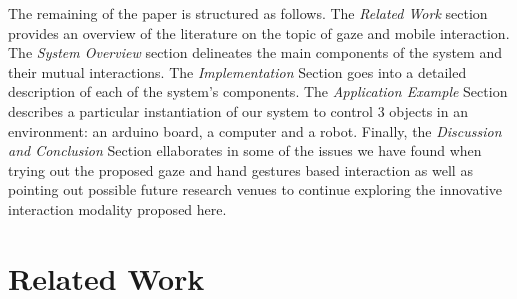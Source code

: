 \documentclass[jou,a4paper,notxfonts]{apa}
\begin{document}
The remaining of the paper is structured as follows. The \emph{Related Work} section provides an overview of the literature on the topic of gaze and mobile interaction. The \emph{System Overview} section delineates the main components of the system and their mutual interactions. The \emph{Implementation} Section goes into a detailed description of each of the system's components. The \emph{Application Example} Section describes a particular instantiation of our system to control 3 objects in an environment: an arduino board, a computer and a robot. Finally, the \emph{Discussion and Conclusion} Section ellaborates in some of the issues we have found when trying out the proposed gaze and hand gestures based interaction as well as pointing out possible future research venues to continue exploring the innovative interaction modality proposed here.






\section{Related Work}
\end{document}
